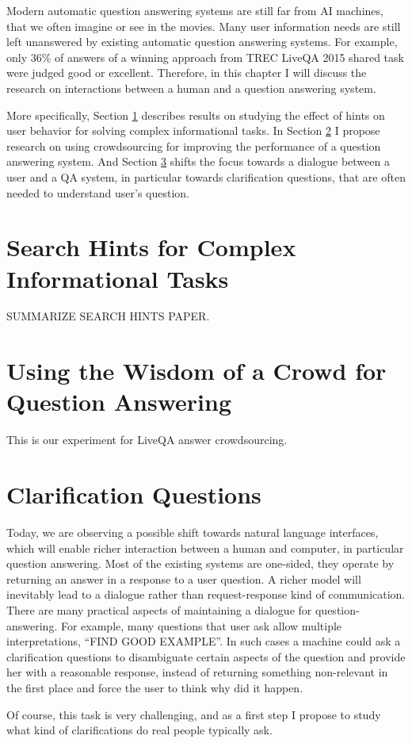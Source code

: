%

\label{chapter:users}

\noindent

Modern automatic question answering systems are still far from AI machines, that we often imagine or see in the movies.
Many user information needs are still left unanswered by existing automatic question answering systems.
For example, only 36\% of answers of a winning approach from TREC LiveQA 2015 shared task were judged good or excellent.
Therefore, in this chapter I will discuss the research on interactions between a human and a question answering system.

More specifically, Section \ref{sec:user:hints} describes results on studying the effect of hints on user behavior for solving complex informational tasks.
In Section \ref{sec:user:crowd} I propose research on using crowdsourcing for improving the performance of a question answering system.
And Section \ref{sec:user:clarification} shifts the focus towards a dialogue between a user and a QA system, in particular towards clarification questions, that are often needed to understand user's question.

\section{Search Hints for Complex Informational Tasks}
\label{sec:user:hints}

SUMMARIZE SEARCH HINTS PAPER.

\section{Using the Wisdom of a Crowd for Question Answering}
\label{sec:user:crowd}

This is our experiment for LiveQA answer crowdsourcing.

\section{Clarification Questions}
\label{sec:user:clarification}

Today, we are observing a possible shift towards natural language interfaces, which will enable richer interaction between a human and computer, in particular question answering.
Most of the existing systems are one-sided, \ie they operate by returning an answer in a response to a user question.
A richer model will inevitably lead to a dialogue rather than request-response kind of communication.
There are many practical aspects of maintaining a dialogue for question-answering.
For example, many questions that user ask allow multiple interpretations, \eg ``FIND GOOD EXAMPLE''.
In such cases a machine could ask a clarification questions to disambiguate certain aspects of the question and provide her with a reasonable response, instead of returning something non-relevant in the first place and force the user to think why did it happen.

Of course, this task is very challenging, and as a first step I propose to study what kind of clarifications do real people typically ask.

